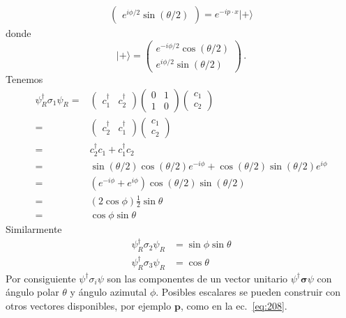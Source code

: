\begin{subappendices}
\begin{align}
\begin{pmatrix}
  e^{i \phi/2}\sin(\theta/2)
  \end{pmatrix}=e^{-i p\cdot x}|+\rangle
\end{align}
donde
\begin{equation}
|+\rangle=  \begin{pmatrix}
  e^{-i \phi/2}\cos(\theta/2)\\
  e^{i \phi/2}\sin(\theta/2)
  \end{pmatrix}\,.
\end{equation}
Tenemos
\begin{align}
  \psi^\dagger_R \sigma_1 \psi_R=&
  \begin{pmatrix}
   c_1^\dagger & c_2^\dagger 
  \end{pmatrix}
  \begin{pmatrix}
    0 & 1\\
    1&0
  \end{pmatrix}
  \begin{pmatrix}
    c_1\\
    c_2
  \end{pmatrix}\nonumber\\
  =&  \begin{pmatrix}
    c_2^\dagger & c_1^\dagger
  \end{pmatrix}
  \begin{pmatrix}
    c_1\\
    c_2
  \end{pmatrix}\nonumber\\
  =&  c_2^\dagger c_1 + c_1^\dagger c_2\nonumber\\
  =&  \sin(\theta/2)\cos(\theta/2)e^{-i\phi}+\cos(\theta/2)\sin(\theta/2)e^{i\phi}\nonumber\\
  =&  (e^{-i\phi}+e^{i\phi})\cos(\theta/2)\sin(\theta/2)\nonumber\\
  =&  (2\cos\phi)\frac{1}{2}\sin\theta\nonumber\\
  =&  \cos\phi\sin\theta
\end{align}
Similarmente
\begin{align}
  \psi^\dagger_R \sigma_2\psi_R&=\sin\phi\sin\theta\nonumber\\
  \psi^\dagger_R \sigma_3\psi_R&=\cos\theta
\end{align}
Por consiguiente $\psi^\dagger \sigma_i\psi$ son las componentes de un vector unitario $\psi^\dagger \boldsymbol{\sigma}\psi$ con \'angulo polar $\theta$ y \'angulo azimutal $\phi$. Posibles escalares se pueden construir con otros vectores disponibles, por ejemplo $\mathbf{p}$, como en la ec.~\eqref{eq:208}.
\begin{align}

\end{align}
\end{subappendices}
